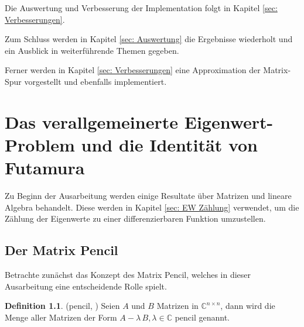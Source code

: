 \documentclass[a4paper,12pt]{report}
\newcommand{\C}{\mathbb C}
\newcommand{\AlamB}{A-\lambda\,B}
\newcommand{\1}{\mathds{1}}
\theoremstyle{plain} %
\theoremstyle{definition} %
\newtheorem{definition}[theorem]{Definition}
\theoremstyle{remark}
\begin{document}

      Die Auswertung und Verbesserung der Implementation folgt in Kapitel \ref{sec: Verbesserungen}.



      Zum Schluss werden in Kapitel \ref{sec: Auswertung} die Ergebnisse wiederholt und ein Ausblick in weiterführende Themen gegeben.

      Ferner werden in Kapitel \ref{sec: Verbesserungen} eine Approximation der Matrix-Spur vorgestellt und ebenfalls implementiert.

\chapter{Das verallgemeinerte Eigenwert-Problem und die Identität von Futamura}
\label{sec: EW Problem_Futamura}

      Zu Beginn der Ausarbeitung werden einige Resultate über Matrizen und lineare Algebra behandelt.
      Diese werden in Kapitel \ref{sec: EW Zählung} verwendet, um die Zählung der Eigenwerte zu einer differenzierbaren Funktion umzustellen.
      
      \section{Der Matrix Pencil}
            Betrachte zunächst das Konzept des Matrix Pencil, welches in dieser Ausarbeitung eine entscheidende Rolle spielt.
            \begin{definition}(pencil, \cite[S. 375]{matrixGolub})
                  \label{def: pencil}
                  Seien $A$ und $B$ Matrizen in $\C^{n\times n}$, dann wird die Menge aller Matrizen der Form
                  $\AlamB, \lambda \in \C$ pencil genannt.
            \end{definition}
\end{document}
